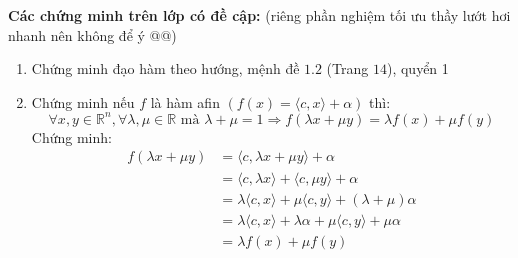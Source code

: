 \documentclass[12pt]{article}
\begin{document}

\begin{tcolorbox}
\textbf{Các chứng minh trên lớp có đề cập:} (riêng phần nghiệm tối ưu thầy lướt hơi nhanh nên không để ý @@)
\begin{enumerate}
	\item Chứng minh đạo hàm theo hướng, mệnh đề $1.2$ (Trang $14$), quyển 1
	\item Chứng minh nếu $f$ là hàm afin $(f(x) = \langle c,x \rangle + \alpha)$ thì:
	$$
		\forall x, y \in \mathbb{R}^n, \forall \lambda, \mu \in \mathbb{R} \text{ mà } \lambda + \mu = 1 \Rightarrow f(\lambda x + \mu y) = \lambda f(x) + \mu f(y)
	$$
	Chứng minh:
		\begin{align*}
			f(\lambda x + \mu y) &= \langle c, \lambda x + \mu y\rangle + \alpha \\
								 &= \langle c, \lambda x\rangle + \langle c, \mu y \rangle + \alpha \\
								 &= \lambda \langle c,x\rangle  + \mu \langle c,y \rangle + (\lambda + \mu)\alpha  \\
								 &= \lambda \langle c,x\rangle + \lambda\alpha + \mu \langle c,y \rangle + \mu\alpha \\
								 &= \lambda f(x) + \mu f(y)
		\end{align*}
\end{enumerate}
\end{tcolorbox}
\end{document}
